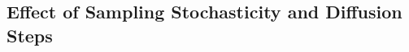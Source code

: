 \documentclass[times, review, 10pt]{elsarticle}
\newcommand{\DIFaddbegin}{\begingroup\color{blue}}
\newcommand{\DIFaddend}{\endgroup}
\begin{document}
\DIFaddbegin
\DIFaddend

\DIFaddbegin
\DIFaddend

\DIFaddbegin
\DIFaddend




\subsection{Effect of Sampling Stochasticity and Diffusion Steps}
\end{document}
